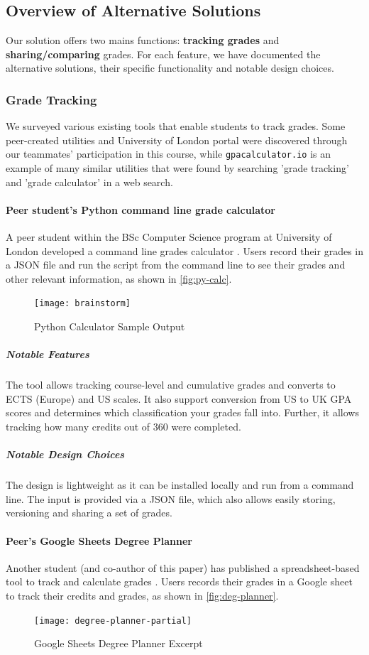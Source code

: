 \subsection{Overview of Alternative Solutions}
Our solution offers two mains functions: \textbf{tracking grades} and \textbf{sharing/comparing} grades. For each feature, we have documented the alternative solutions, their specific functionality and notable design choices.

\subsubsection{Grade Tracking}
We surveyed various existing tools that enable students to track grades. Some peer-created utilities and University of London portal were discovered through our teammates' participation in this course, while \texttt{gpacalculator.io} \cite{gpa_calculator} is an example of many similar utilities that were found by searching 'grade tracking' and 'grade calculator' in a web search.

\paragraph{Peer student's Python command line grade calculator}
A peer student within the BSc Computer Science program at University of London developed a command line grades calculator \cite{lavoie_2020}. Users record their grades in a JSON file and run the script from the command line to see their grades and other relevant information, as shown in \autoref{fig:py-calc}.

\begin{figure}[H]
\centering
\texttt{[image: brainstorm]}
\caption{Python Calculator Sample Output}
\label{fig:py-calc}
\end{figure}

\subparagraph{Notable Features}
The tool allows tracking course-level and cumulative grades and converts to ECTS (Europe) and US scales. It also support conversion from US to UK GPA scores and determines which classification your grades fall into. Further, it allows tracking how many credits out of 360 were completed.

\subparagraph{Notable Design Choices}
The design is lightweight as it can be installed locally and run from a command line. The input is provided via a JSON file, which also allows easily storing, versioning and sharing a set of grades.

\paragraph{Peer's Google Sheets Degree Planner}
Another student (and co-author of this paper) has published a spreadsheet-based tool to track and calculate grades \cite{muralidharan_2020}. Users records their grades in a Google sheet to track their credits and grades, as shown in \autoref{fig:deg-planner}.
\begin{figure}[H]
\noindent \texttt{[image: degree-planner-partial]}
\centering
\caption{Google Sheets Degree Planner Excerpt}
\label{fig:deg-planner}
\end{figure}

